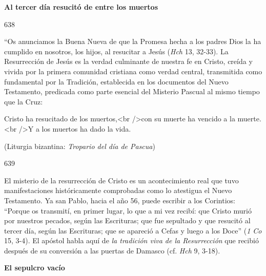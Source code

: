 			\begin{ccebody}\textbf{Al tercer día resucitó de entre los muertos}\end{ccebody}
			
			\begin{ccebody}\begin{ccenumber}638\end{ccenumber} “Os anunciamos la Buena Nueva de que la Promesa hecha a los padres Dios la ha cumplido en nosotros, los hijos, al resucitar a Jesús (\textit{Hch} 13, 32-33). La Resurrección de Jesús es la verdad culminante de nuestra fe en Cristo, creída y vivida por la primera comunidad cristiana como verdad central, transmitida como fundamental por la Tradición, establecida en los documentos del Nuevo Testamento, predicada como parte esencial del Misterio Pascual al mismo tiempo que la Cruz:\end{ccebody}
			
			\begin{ccecite}Cristo ha resucitado de los muertos,<br />con su muerte ha vencido a la muerte.<br />Y a los muertos ha dado la vida.\end{ccecite}
			
			\begin{ccecite}(Liturgia bizantina: \textit{Tropario del día de Pascua})\end{ccecite}
			
			\begin{ccebody}\begin{ccenumber}639\end{ccenumber} El misterio de la resurrección de Cristo es un acontecimiento real que tuvo manifestaciones históricamente comprobadas como lo atestigua el Nuevo Testamento. Ya san Pablo, hacia el año 56, puede escribir a los Corintios: “Porque os transmití, en primer lugar, lo que a mi vez recibí: que Cristo murió por nuestros pecados, según las Escrituras; que fue sepultado y que resucitó al tercer día, según las Escrituras; que se apareció a Cefas y luego a los Doce” (\textit{1 Co} 15, 3-4). El apóstol habla aquí de \textit{la tradición viva de la Resurrección} que recibió después de su conversión a las puertas de Damasco (cf. \textit{Hch} 9, 3-18).\end{ccebody}
			
			\begin{ccebody}\textbf{El sepulcro vacío}\end{ccebody}
			
